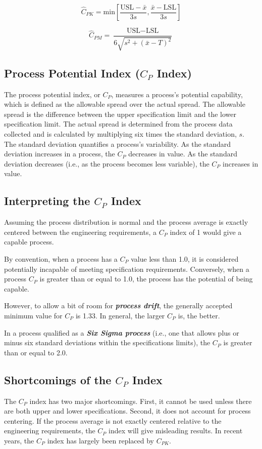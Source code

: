 \documentclass[11pt]{article} %
\begin{document}
\[ \hat{C}_{PK} = \mbox{min} \left[\frac{\mbox{USL} - \bar{x}}{3s},\frac{\bar{x} - \mbox{LSL}}{3s} \right] \]

\[ \hat{C}_{PM} = \frac{\mbox{USL} - \mbox{LSL}}{6\sqrt{s^2+(\bar{x}-T)^2}}\]
\bigskip

\subsection*{Process Potential Index ($C_P$ Index)}

The process potential index, or $C_P$, measures a process's potential capability, which is defined as the allowable spread over the actual spread. The allowable spread is the difference between the upper specification limit and the lower specification limit. The actual spread is determined from the process data collected and is calculated by multiplying six times the standard deviation, $s$. The standard deviation quantifies a process's variability. As the standard deviation increases in a process, the $C_P$ decreases in value. As the standard deviation decreases (i.e., as the process becomes less variable), the $C_P$ increases in value.


\subsection*{Interpreting the $C_P$ Index}
Assuming the process distribution is normal and the process average is exactly centered between the engineering requirements, a $C_P$ index of 1 would give a capable process. 

By convention, when a process has a $C_P$ value less than 1.0, it is considered potentially incapable of meeting specification requirements. Conversely, when a process $C_P$ is greater than or equal to 1.0, the process has the potential of being capable.

However, to allow a bit of room for \textit{\textbf{process drift}}, the generally accepted minimum value for $C_P$ is 1.33. In general, the larger $C_P$ is, the better. 

In a process qualified as a \textit{\textbf{Six Sigma process}} (i.e., one that allows plus or minus six standard deviations within the specifications limits), the $C_P$ is greater than or equal to 2.0.

\subsection*{Shortcomings of the $C_P$ Index}
The $C_P$ index has two major shortcomings. First, it cannot be used unless there are both upper and lower specifications. Second, it does not account for process centering. If the process average is not exactly centered relative to the engineering requirements, the $C_P$ index will give misleading results. In recent years, the $C_P$ index has largely been replaced by $C_{PK}$.
\end{document}
